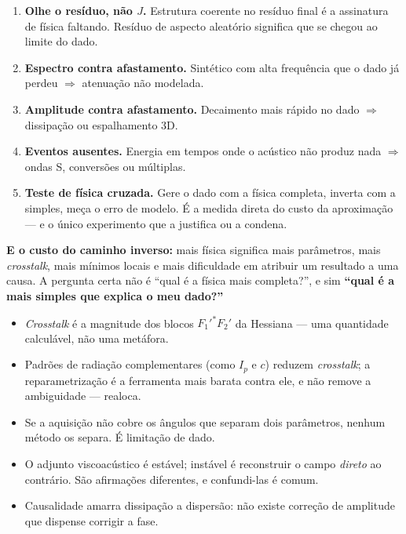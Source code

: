 \documentclass[11pt,a4paper,oneside]{report}
\begin{document}
\begin{pratica}
\begin{enumerate}[leftmargin=*, itemsep=1pt]
\item \textbf{Olhe o res\'iduo, n\~ao $J$.} Estrutura coerente no res\'iduo
final \'e a assinatura de f\'isica faltando. Res\'iduo de aspecto aleat\'orio
significa que se chegou ao limite do dado.
\item \textbf{Espectro contra afastamento.} Sint\'etico com alta frequ\^encia
que o dado j\'a perdeu $\Rightarrow$ atenua\c{c}\~ao n\~ao modelada.
\item \textbf{Amplitude contra afastamento.} Decaimento mais r\'apido no dado
$\Rightarrow$ dissipa\c{c}\~ao ou espalhamento 3D.
\item \textbf{Eventos ausentes.} Energia em tempos onde o ac\'ustico n\~ao
produz nada $\Rightarrow$ ondas S, convers\~oes ou m\'ultiplas.
\item \textbf{Teste de f\'isica cruzada.} Gere o dado com a f\'isica completa,
inverta com a simples, me\c{c}a o erro de modelo. \'E a medida direta do custo
da aproxima\c{c}\~ao --- e o \'unico experimento que a justifica ou a
condena.
\end{enumerate}

\textbf{E o custo do caminho inverso:} mais f\'isica significa mais
par\^ametros, mais \emph{crosstalk}, mais m\'inimos locais e mais dificuldade
em atribuir um resultado a uma causa. A pergunta certa n\~ao \'e ``qual \'e a
f\'isica mais completa?'', e sim \textbf{``qual \'e a mais simples que explica
o meu dado?''}
\end{pratica}

\begin{resumo}
\begin{itemize}[leftmargin=*, itemsep=1pt]
\item \emph{Crosstalk} \'e a magnitude dos blocos $F_1'^{*}F_2'$ da Hessiana ---
uma quantidade calcul\'avel, n\~ao uma met\'afora.
\item Padr\~oes de radia\c{c}\~ao complementares (como $I_p$ e $c$) reduzem
\emph{crosstalk}; a reparametriza\c{c}\~ao \'e a ferramenta mais barata contra
ele, e n\~ao remove a ambiguidade --- realoca.
\item Se a aquisi\c{c}\~ao n\~ao cobre os \^angulos que separam dois
par\^ametros, nenhum m\'etodo os separa. \'E limita\c{c}\~ao de dado.
\item O adjunto viscoac\'ustico \'e est\'avel; inst\'avel \'e reconstruir o
campo \emph{direto} ao contr\'ario. S\~ao afirma\c{c}\~oes diferentes, e
confundi-las \'e comum.
\item Causalidade amarra dissipa\c{c}\~ao a dispers\~ao: n\~ao existe
corre\c{c}\~ao de amplitude que dispense corrigir a fase.
\end{itemize}
\end{resumo}
\end{document}
